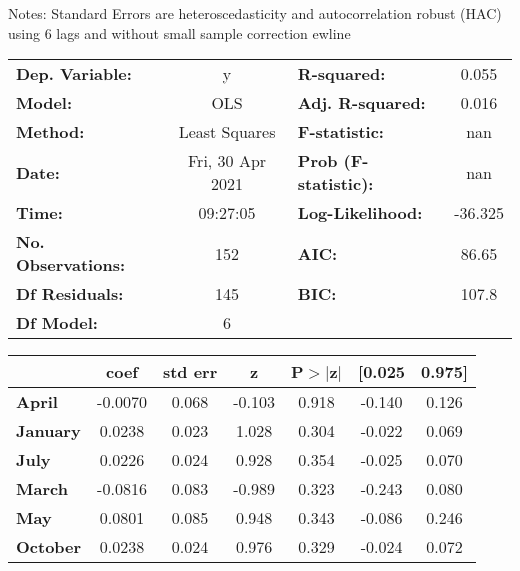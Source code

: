 Notes: \newline
 [1] Standard Errors are heteroscedasticity and autocorrelation robust (HAC) using 6 lags and without small sample correction
ewline\begin{center}
\begin{tabular}{lclc}
\toprule
\textbf{Dep. Variable:}    &        y         & \textbf{  R-squared:         } &     0.055   \\
\textbf{Model:}            &       OLS        & \textbf{  Adj. R-squared:    } &     0.016   \\
\textbf{Method:}           &  Least Squares   & \textbf{  F-statistic:       } &       nan   \\
\textbf{Date:}             & Fri, 30 Apr 2021 & \textbf{  Prob (F-statistic):} &      nan    \\
\textbf{Time:}             &     09:27:05     & \textbf{  Log-Likelihood:    } &   -36.325   \\
\textbf{No. Observations:} &         152      & \textbf{  AIC:               } &     86.65   \\
\textbf{Df Residuals:}     &         145      & \textbf{  BIC:               } &     107.8   \\
\textbf{Df Model:}         &           6      & \textbf{                     } &             \\
\bottomrule
\end{tabular}
\begin{tabular}{lcccccc}
                 & \textbf{coef} & \textbf{std err} & \textbf{z} & \textbf{P$> |$z$|$} & \textbf{[0.025} & \textbf{0.975]}  \\
\midrule
\textbf{April}   &      -0.0070  &        0.068     &    -0.103  &         0.918        &       -0.140    &        0.126     \\
\textbf{January} &       0.0238  &        0.023     &     1.028  &         0.304        &       -0.022    &        0.069     \\
\textbf{July}    &       0.0226  &        0.024     &     0.928  &         0.354        &       -0.025    &        0.070     \\
\textbf{March}   &      -0.0816  &        0.083     &    -0.989  &         0.323        &       -0.243    &        0.080     \\
\textbf{May}     &       0.0801  &        0.085     &     0.948  &         0.343        &       -0.086    &        0.246     \\
\textbf{October} &       0.0238  &        0.024     &     0.976  &         0.329        &       -0.024    &        0.072     \\

\end{tabular}
\end{center}
